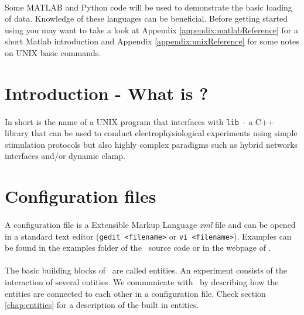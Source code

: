 \paragraph{}
Some MATLAB and Python code will be used to demonstrate the basic loading of data. Knowledge of these languages can be beneficial.
Before getting started using \texttt{\progname} you may want to take a look at Appendix \ref{appendix:matlabReference} for a short Matlab introduction and Appendix \ref{appendix:unixReference} for some notes on UNIX basic commands.

\section{Introduction - What is \progname?}

\paragraph{}
In short \textbf{\progname} is the name of a UNIX program that interfaces with \texttt{lib\progname}\  - a C++ library that can be used to conduct electrophysiological experiments using simple stimulation protocols but also highly complex paradigms such as hybrid networks interfaces and/or dynamic clamp. 




\iffalse

\section{Configuration files}
\paragraph{}
A configuration file is a Extensible Markup Language \emph{xml} file and can be opened in a standard text editor (\texttt{gedit <filename>} or \texttt{vi <filename>}). Examples can be found in the examples folder of the \progname\ source code or in the webpage of \href{http://www.tnb.ua.ac.be}{\progname}.

\paragraph{}
The basic building blocks of \progname\ are called entities. An experiment consists of the interaction of several entities. We communicate with \progname\ by describing how the entities are connected to each other in a configuration file. Check section \ref{chap:entities} for a description of the built in entities.

